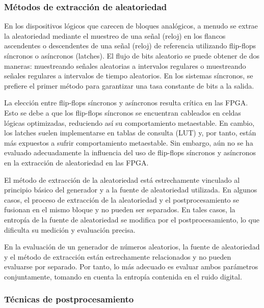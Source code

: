             \subsubsection{Métodos de extracción de aleatoriedad}	

            En los dispositivos lógicos que carecen de bloques analógicos, a menudo se extrae la aleatoriedad mediante el muestreo de una señal (reloj) en los flancos ascendentes o descendentes de una señal (reloj) de referencia utilizando flip-flops síncronos o asíncronos (latches). El flujo de bits aleatorio se puede obtener de dos maneras: muestreando señales aleatorias a intervalos regulares o muestreando señales regulares a intervalos de tiempo aleatorios. En los sistemas síncronos, se prefiere el primer método para garantizar una tasa constante de bits a la salida.

            La elección entre flip-flops síncronos y asíncronos resulta crítica en las FPGA. Esto se debe a que los flip-flops síncronos se encuentran cableados en celdas lógicas optimizadas, reduciendo así su comportamiento metaestable. En cambio, los latches suelen implementarse en tablas de consulta (LUT) y, por tanto, están más expuestos a sufrir comportamiento metaestable. Sin embargo, aún no se ha evaluado adecuadamente la influencia del uso de flip-flops síncronos y asíncronos en la extracción de aleatoriedad en las FPGA.
                
            El método de extracción de la aleatoriedad está estrechamente vinculado al principio básico del generador y a la fuente de aleatoriedad utilizada. En algunos casos, el proceso de extracción de la aleatoriedad y el postprocesamiento se fusionan en el mismo bloque y no pueden ser separados. En tales casos, la entropía de la fuente de aleatoriedad se modifica por el postprocesamiento, lo que dificulta su medición y evaluación precisa.
                
            En la evaluación de un generador de números aleatorios, la fuente de aleatoriedad y el método de extracción están estrechamente relacionados y no pueden evaluarse por separado. Por tanto, lo más adecuado es evaluar ambos parámetros conjuntamente, tomando en cuenta la entropía contenida en el ruido digital.
    
            \subsubsection{Técnicas de postprocesamiento}
                
